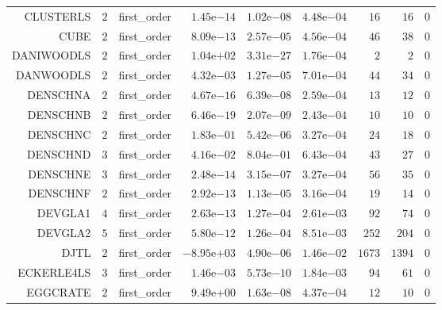 \begin{longtable}{rrrrrrrrr}
CLUSTERLS & \(     2\) & first\_order & \( 1.45\)e\(-14\) & \( 1.02\)e\(-08\) & \( 4.48\)e\(-04\) & \(    16\) & \(    16\) & \(     0\) \\
CUBE & \(     2\) & first\_order & \( 8.09\)e\(-13\) & \( 2.57\)e\(-05\) & \( 4.56\)e\(-04\) & \(    46\) & \(    38\) & \(     0\) \\
DANIWOODLS & \(     2\) & first\_order & \( 1.04\)e\(+02\) & \( 3.31\)e\(-27\) & \( 1.76\)e\(-04\) & \(     2\) & \(     2\) & \(     0\) \\
DANWOODLS & \(     2\) & first\_order & \( 4.32\)e\(-03\) & \( 1.27\)e\(-05\) & \( 7.01\)e\(-04\) & \(    44\) & \(    34\) & \(     0\) \\
DENSCHNA & \(     2\) & first\_order & \( 4.67\)e\(-16\) & \( 6.39\)e\(-08\) & \( 2.59\)e\(-04\) & \(    13\) & \(    12\) & \(     0\) \\
DENSCHNB & \(     2\) & first\_order & \( 6.46\)e\(-19\) & \( 2.07\)e\(-09\) & \( 2.43\)e\(-04\) & \(    10\) & \(    10\) & \(     0\) \\
DENSCHNC & \(     2\) & first\_order & \( 1.83\)e\(-01\) & \( 5.42\)e\(-06\) & \( 3.27\)e\(-04\) & \(    24\) & \(    18\) & \(     0\) \\
DENSCHND & \(     3\) & first\_order & \( 4.16\)e\(-02\) & \( 8.04\)e\(-01\) & \( 6.43\)e\(-04\) & \(    43\) & \(    27\) & \(     0\) \\
DENSCHNE & \(     3\) & first\_order & \( 2.48\)e\(-14\) & \( 3.15\)e\(-07\) & \( 3.27\)e\(-04\) & \(    56\) & \(    35\) & \(     0\) \\
DENSCHNF & \(     2\) & first\_order & \( 2.92\)e\(-13\) & \( 1.13\)e\(-05\) & \( 3.16\)e\(-04\) & \(    19\) & \(    14\) & \(     0\) \\
DEVGLA1 & \(     4\) & first\_order & \( 2.63\)e\(-13\) & \( 1.27\)e\(-04\) & \( 2.61\)e\(-03\) & \(    92\) & \(    74\) & \(     0\) \\
DEVGLA2 & \(     5\) & first\_order & \( 5.80\)e\(-12\) & \( 1.26\)e\(-04\) & \( 8.51\)e\(-03\) & \(   252\) & \(   204\) & \(     0\) \\
DJTL & \(     2\) & first\_order & \(-8.95\)e\(+03\) & \( 4.90\)e\(-06\) & \( 1.46\)e\(-02\) & \(  1673\) & \(  1394\) & \(     0\) \\
ECKERLE4LS & \(     3\) & first\_order & \( 1.46\)e\(-03\) & \( 5.73\)e\(-10\) & \( 1.84\)e\(-03\) & \(    94\) & \(    61\) & \(     0\) \\
EGGCRATE & \(     2\) & first\_order & \( 9.49\)e\(+00\) & \( 1.63\)e\(-08\) & \( 4.37\)e\(-04\) & \(    12\) & \(    10\) & \(     0\) \\

\end{longtable}
